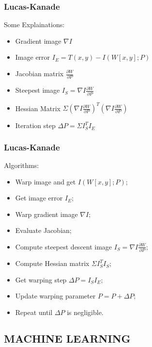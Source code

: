 \begin{frame}
\frametitle{Lucas-Kanade}
  \begin{blueblock}{Some Explainations:}
    \begin{itemize}
\item Gradient image $\nabla I$
\item Image error $I_E = T(x, y) - I(W[x, y]; P)$
\item Jacobian matrix $ \frac{\partial W}{\partial P} $
\item Steepest image  $ I_S =  \nabla I \frac{\partial W}{\partial P}$
\item Hessian Matrix $\Sigma (\nabla I \frac{\partial W}{\partial
    P})^T(\nabla I \frac{\partial W}{\partial P})$
\item Iteration step $ \Delta P =  \Sigma I_S^T I_E$
    \end{itemize}

\end{blueblock}

\end{frame}

\begin{frame}
\frametitle{Lucas-Kanade}
  \begin{greyblock}{Algorithms: }
    \begin{itemize}
    \item Warp image and get $I(W[x, y]; P)$;
    \item Get image error $I_E$;
    \item Warp gradient image $\nabla I$;
    \item Evaluate Jacobian;
    \item Compute steepest descent image  $I_S = \nabla I \frac{\partial W}{\partial
    P}$;
    \item Compute Hessian matrix $\Sigma I_S^TI_S$;
    \item Get warping step $\Delta P = I_SI_E$;
    \item Update warping parameter $P = P + \Delta P$;
      \item Repeat until $\Delta P$ is negligible.
    \end{itemize}
  \end{greyblock}
\end{frame}


\subsection{MACHINE LEARNING}



